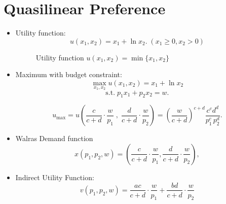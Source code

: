 \documentclass[
12pt, %
a4paper, %
onecolumn, %
portrait %
]{article}
\begin{document}
\section{Quasilinear Preference}
\begin{itemize}
	
\item Utility function:
\[
u(x_1,x_2)=x_1+\ln x_2.\;(x_1\ge0,x_2> 0)
\]

\begin{figure}[H]
	\centering
	\caption{Utility function $u(x_1,x_2)=\min\{x_1,x_2\}$}
	\label{Fig.lable}
\end{figure}

\item Maximum with budget constraint:
\[
\max_{x_1,x_2} u(x_1,x_2)=x_1+\ln x_2
\]
\[
\text{s.t.}\;p_1x_1+p_2x_2=w.
\]

\[
u_{\max}=u\left(\frac{c}{c+d}\cdot\frac{w}{p_1}\;,\;\frac{d}{c+d}\cdot\frac{w}{p_2}\right)=\left(\frac{w}{c+d}\right)^{c+d}\frac{c^cd^d}{p_1^c\,p_2^d}.
\]
	
\item Walras Demand function
\[
x(p_1,p_2,w)=\left(\frac{c}{c+d}\cdot\frac{w}{p_1},\frac{d}{c+d}\cdot\frac{w}{p_2}\right),
\]
\item Indirect Utility Function:
\[
v(p_1,p_2,w)=\frac{ac}{c+d}\cdot\frac{w}{p_1}+\frac{bd}{c+d}\cdot\frac{w}{p_2}
\]


\end{itemize}













\end{document}
